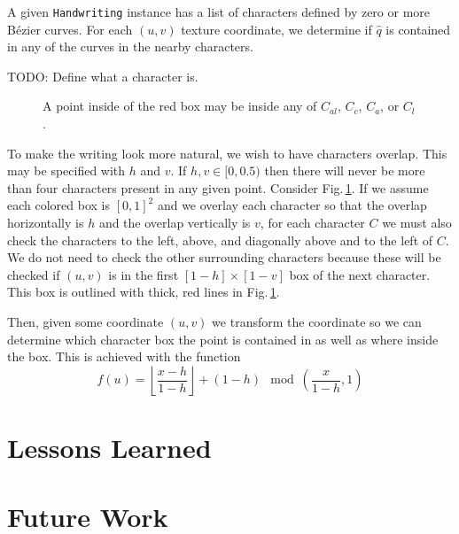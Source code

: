 \documentclass[12pt]{article}
\begin{document}
A given \texttt{Handwriting} instance has a list of characters defined by zero or more B\'ezier curves. For each $(u,v)$ texture coordinate, we determine if $\hat{q}$ is contained in any of the curves in the nearby characters.

TODO: Define what a character is.

\begin{figure}[ht]
\centering
{}
\label{character-boxes}
\caption{A point inside of the red box may be inside any of $C_{al}$, $C_c$, $C_a$, or $C_l$.}
\end{figure}

To make the writing look more natural, we wish to have characters overlap. This may be specified with $h$ and $v$. If $h,v \in [0,0.5)$ then there will never be more than four characters present in any given point. Consider Fig.\,\ref{character-boxes}. If we assume each colored box is $[0,1]^2$ and we overlay each character so that the overlap horizontally is $h$ and the overlap vertically is $v$, for each character $C$ we must also check the characters to the left, above, and diagonally above and to the left of $C$. We do not need to check the other surrounding characters because these will be checked if $(u,v)$ is in the first $[1-h] \times [1-v]$ box of the next character. This box is outlined with thick, red lines in Fig.\,\ref{character-boxes}.

Then, given some coordinate $(u,v)$ we transform the coordinate so we can determine which character box the point is contained in as well as where inside the box. This is achieved with the function
\[
	f(u) = \left\lfloor \frac{x - h}{1-h} \right\rfloor + (1-h)\mod \left(\frac{x}{1-h}, 1\right)
\]

\section{Lessons Learned}

\section{Future Work}
\end{document}
